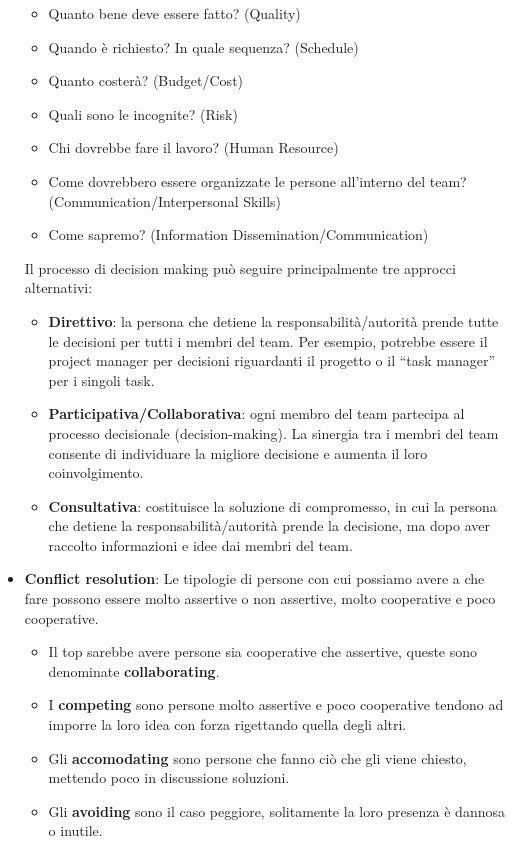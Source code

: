 \begin{itemize}
\begin{itemize}
		\item Quanto bene deve essere fatto? (Quality)
		\item Quando è richiesto? In quale sequenza? (Schedule)
		\item Quanto costerà? (Budget/Cost)
		\item Quali sono le incognite? (Risk)
		\item Chi dovrebbe fare il lavoro? (Human Resource)
		\item Come dovrebbero essere organizzate le persone all’interno del team? (Communication/Interpersonal Skills)
		\item Come sapremo? (Information Dissemination/Communication)
	\end{itemize}
	Il processo di decision making può seguire principalmente tre approcci alternativi:
	\begin{itemize}
		\item \textbf{Direttivo}: la persona che detiene la responsabilità/autorità prende tutte le decisioni per tutti i membri del team. Per esempio, potrebbe essere il project manager per decisioni riguardanti il progetto o il “task manager” per i singoli task.
		\item \textbf{Participativa/Collaborativa}: ogni membro del team partecipa al processo decisionale (decision-making). La sinergia tra i membri del team consente di individuare la migliore decisione e aumenta il loro coinvolgimento.
		\item \textbf{Consultativa}: costituisce la soluzione di compromesso, in cui la persona che detiene la responsabilità/autorità prende la decisione, ma dopo aver raccolto informazioni e idee dai membri del team.
	\end{itemize}
	\item \textbf{Conflict resolution}: Le tipologie di persone con cui possiamo avere a che fare possono essere molto assertive o non assertive, molto cooperative e poco cooperative.
	\begin{itemize}
		\item Il top sarebbe avere persone sia cooperative che assertive, queste sono denominate \textbf{collaborating}.
		\item I \textbf{competing} sono persone molto assertive e poco cooperative tendono ad imporre la loro idea con forza rigettando quella degli altri.
		\item Gli \textbf{accomodating} sono persone che fanno ciò che gli viene chiesto, mettendo poco in discussione soluzioni.
		\item Gli \textbf{avoiding} sono il caso peggiore, solitamente la loro presenza è dannosa o inutile.

\end{itemize}
\end{itemize}
